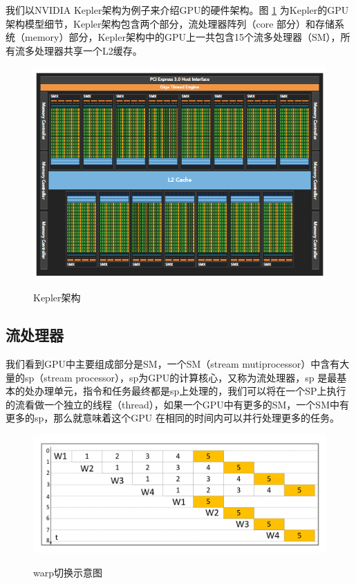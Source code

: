 我们以NVIDIA Kepler架构为例子来介绍GPU的硬件架构。图 \ref{KPA} 为Kepler的GPU架构模型细节，Kepler架构包含两个部分，流处理器阵列（core 部分）和存储系统（memory）部分，Kepler架构中的GPU上一共包含15个流多处理器（SM），所有流多处理器共享一个L2缓存。
\begin{figure}
\setlength{\belowcaptionskip}{-0.5cm}
\begin{center}
{\includegraphics[width=1 \textwidth]{figures/arc.png}}
\end{center}
\caption{{\footnotesize{Kepler架构}}}
\label{KPA}
\end{figure}
\subsection {流处理器}
我们看到GPU中主要组成部分是SM，一个SM（stream mutiprocessor）中含有大量的sp（stream processor），sp为GPU的计算核心，又称为流处理器，sp 是最基本的处办理单元，指令和任务最终都是sp上处理的，我们可以将在一个SP上执行的流看做一个独立的线程（thread），如果一个GPU中有更多的SM，一个SM中有更多的sp，那么就意味着这个GPU 在相同的时间内可以并行处理更多的任务。
\begin{figure}
\setlength{\belowcaptionskip}{-0.5cm}
\begin{center}
{\includegraphics[width=1 \textwidth]{figures/warpsketch.pdf}}
\end{center}
\caption{{\footnotesize{warp切换示意图}}}
\label{wps}
\end{figure}
